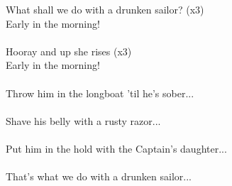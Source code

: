 
What shall we do with a drunken sailor? (x3) \\ Early in the morning! \\ \hspace{10mm} \\ Hooray and up she rises (x3) \\ Early in the morning! \\ \hspace{10mm} \\ Throw him in the longboat 'til he's sober... \\ \hspace{10mm} \\ Shave his belly with a rusty razor... \\ \hspace{10mm} \\ Put him in the hold with the Captain's daughter... \\ \hspace{10mm} \\ That's what we do with a drunken sailor...